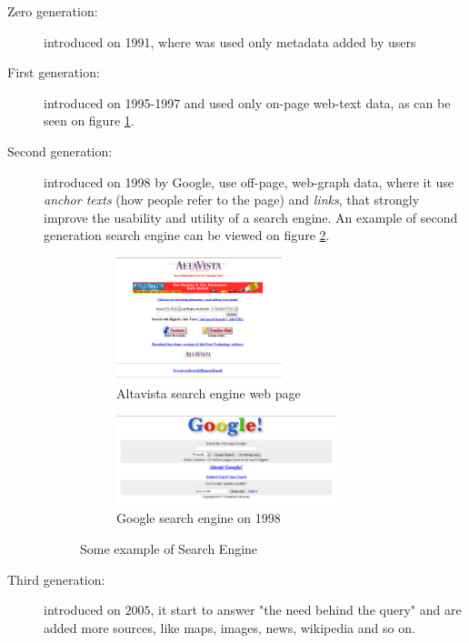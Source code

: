 \begin{description}
    \item [Zero generation: ] introduced on 1991, where was used only metadata added by users
    \item [First generation: ] introduced on 1995-1997 and used only on-page web-text data, as can be seen on 
                               figure \ref{img:altavista}.
                               \begin{figure}
                                \end{figure}
    \item [Second generation: ] introduced on 1998 by Google, use off-page, web-graph data, where it
                                use \emph{anchor texts} (how people refer to the page) and \emph{links}, that
                                strongly improve the usability and utility of a search engine.
                                An example of second generation search engine can be viewed on figure \ref{img:google}.
                                \begin{figure}
				    \begin{subfigure}{0.6\textwidth}
                                    	\includegraphics[width=0.6\textwidth]{Images/altavista}
                                    	\caption{Altavista search engine web page}
                                    	\label{img:altavista}
				    \end{subfigure}
				    \begin{subfigure}{0.6\textwidth}
                                    	\includegraphics[width=0.8\textwidth]{Images/google}
                                    	\caption{Google search engine on 1998}
                                    	\label{img:google}
				    \end{subfigure}
				    \caption{Some example of Search Engine}
				    \label{img:generationSearch}
                                \end{figure}
    \item [Third generation: ] introduced on $2005$, it start to answer "the need behind the query" and are
                               added more sources, like maps, images, news, wikipedia and so on. 


\end{description}
